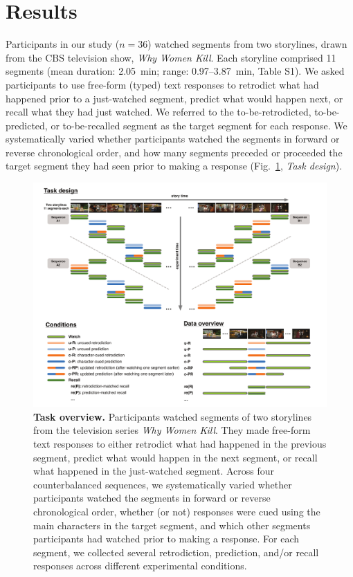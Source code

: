 \documentclass[10pt]{article}
\newcommand{\stimDescription}{S1} %
\begin{document}
\section*{Results}
Participants in our study ($n = 36$) watched segments from two storylines, drawn from the CBS television show, \textit{Why Women Kill}.  Each storyline comprised 11 segments (mean duration: 2.05~min; range: 0.97--3.87~min, Table \stimDescription).  We asked participants to use free-form (typed) text responses to retrodict what had happened prior to a just-watched segment, predict what would happen next, or recall what they had just watched. We referred to the to-be-retrodicted, to-be-predicted, or to-be-recalled segment as the target segment for each response. We systematically varied whether participants watched the segments in forward or reverse chronological order, and how many segments preceded or proceeded the target segment they had seen prior to making a response (Fig.~\ref{fig:method}, \textit{Task design}).

\begin{figure}[tp]
  \centering
  \includegraphics[width=\textwidth]{methods}
  \caption{\textbf{Task overview.} Participants watched segments of two storylines from the television series \textit{Why Women Kill}.  They made free-form text responses to either retrodict what had happened in the previous segment, predict what would happen in the next segment, or recall what happened in the just-watched segment. Across four counterbalanced sequences, we systematically varied whether participants watched the segments in forward or reverse chronological order, whether (or not) responses were cued using the main characters in the target segment, and which other segments participants had watched prior to making a response.  For each segment, we collected several retrodiction, prediction, and/or recall responses across different experimental conditions.}
  \label{fig:method}
\end{figure}
\end{document}

